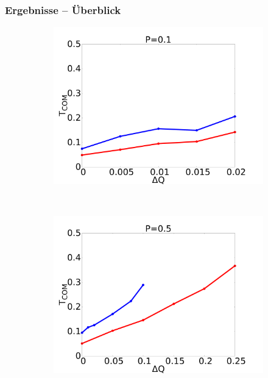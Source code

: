 \documentclass{beamer}
\begin{document}
\begin{frame}
\frametitle{Ergebnisse -- Überblick}
\begin{figure}[h]
    \begin{center}
        \begin{subfigure}[t]{0.3\textwidth}
            \includegraphics[scale=0.09]{../images/p01_com.pdf}
        \end{subfigure} 
        \
        \begin{subfigure}[t]{0.3\textwidth}
            \includegraphics[scale=0.09]{../images/p05_com.pdf}
        \end{subfigure} 
        \
        \begin{subfigure}[t]{0.3\textwidth}

\end{subfigure}
\end{center}
\end{figure}
\end{frame}
\end{document}
